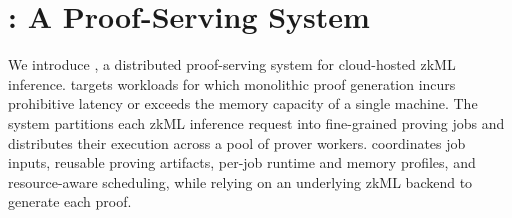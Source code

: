 

\section{\TITLE{}: A Proof-Serving System}
\label{sec:design}



We introduce \TITLE{}, a distributed proof-serving system for cloud-hosted zkML inference. \TITLE{} targets workloads for which monolithic proof generation incurs prohibitive latency or exceeds the memory capacity of a single machine. The system partitions each zkML inference request into fine-grained proving jobs and distributes their execution across a pool of prover workers. \TITLE{} coordinates job inputs, reusable proving artifacts, per-job runtime and memory profiles, and resource-aware scheduling, while relying on an underlying zkML backend to generate each proof.







